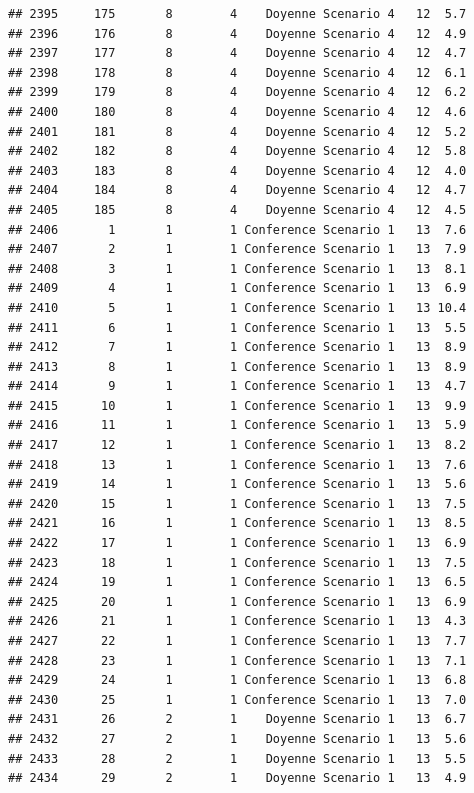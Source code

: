 \documentclass[
]{article}
\begin{document}
\begin{verbatim}
## 2395     175       8        4    Doyenne Scenario 4   12  5.7
## 2396     176       8        4    Doyenne Scenario 4   12  4.9
## 2397     177       8        4    Doyenne Scenario 4   12  4.7
## 2398     178       8        4    Doyenne Scenario 4   12  6.1
## 2399     179       8        4    Doyenne Scenario 4   12  6.2
## 2400     180       8        4    Doyenne Scenario 4   12  4.6
## 2401     181       8        4    Doyenne Scenario 4   12  5.2
## 2402     182       8        4    Doyenne Scenario 4   12  5.8
## 2403     183       8        4    Doyenne Scenario 4   12  4.0
## 2404     184       8        4    Doyenne Scenario 4   12  4.7
## 2405     185       8        4    Doyenne Scenario 4   12  4.5
## 2406       1       1        1 Conference Scenario 1   13  7.6
## 2407       2       1        1 Conference Scenario 1   13  7.9
## 2408       3       1        1 Conference Scenario 1   13  8.1
## 2409       4       1        1 Conference Scenario 1   13  6.9
## 2410       5       1        1 Conference Scenario 1   13 10.4
## 2411       6       1        1 Conference Scenario 1   13  5.5
## 2412       7       1        1 Conference Scenario 1   13  8.9
## 2413       8       1        1 Conference Scenario 1   13  8.9
## 2414       9       1        1 Conference Scenario 1   13  4.7
## 2415      10       1        1 Conference Scenario 1   13  9.9
## 2416      11       1        1 Conference Scenario 1   13  5.9
## 2417      12       1        1 Conference Scenario 1   13  8.2
## 2418      13       1        1 Conference Scenario 1   13  7.6
## 2419      14       1        1 Conference Scenario 1   13  5.6
## 2420      15       1        1 Conference Scenario 1   13  7.5
## 2421      16       1        1 Conference Scenario 1   13  8.5
## 2422      17       1        1 Conference Scenario 1   13  6.9
## 2423      18       1        1 Conference Scenario 1   13  7.5
## 2424      19       1        1 Conference Scenario 1   13  6.5
## 2425      20       1        1 Conference Scenario 1   13  6.9
## 2426      21       1        1 Conference Scenario 1   13  4.3
## 2427      22       1        1 Conference Scenario 1   13  7.7
## 2428      23       1        1 Conference Scenario 1   13  7.1
## 2429      24       1        1 Conference Scenario 1   13  6.8
## 2430      25       1        1 Conference Scenario 1   13  7.0
## 2431      26       2        1    Doyenne Scenario 1   13  6.7
## 2432      27       2        1    Doyenne Scenario 1   13  5.6
## 2433      28       2        1    Doyenne Scenario 1   13  5.5
## 2434      29       2        1    Doyenne Scenario 1   13  4.9

\end{verbatim}
\end{document}
